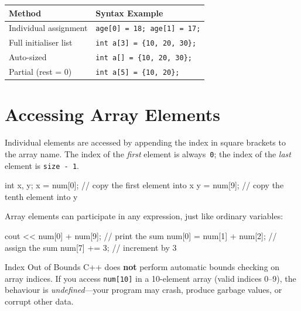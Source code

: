 \begin{center}
\renewcommand{\arraystretch}{1.4}
\begin{tabular}{@{} l l @{}}
\toprule
\textbf{Method} & \textbf{Syntax Example} \\
\midrule
Individual assignment & \texttt{age[0] = 18; age[1] = 17;} \\
Full initialiser list & \texttt{int a[3] = \{10, 20, 30\};} \\
Auto-sized            & \texttt{int a[] = \{10, 20, 30\};} \\
Partial (rest = 0)    & \texttt{int a[5] = \{10, 20\};} \\
\bottomrule
\end{tabular}
\end{center}

\section{Accessing Array Elements}
\label{sec:accessing-arrays}

Individual elements are accessed by appending the index in square brackets to
the array name. The index of the \emph{first} element is always~\texttt{0};
the index of the \emph{last} element is \texttt{size\,-\,1}.

\begin{cppcode}
int x, y;
x = num[0];   // copy the first element into x
y = num[9];   // copy the tenth element into y
\end{cppcode}

Array elements can participate in any expression, just like ordinary
variables:

\begin{cppcode}
cout << num[0] + num[9];     // print the sum
num[0] = num[1] + num[2];   // assign the sum
num[7] += 3;                 // increment by 3
\end{cppcode}

\begin{warningbox}{Index Out of Bounds}
C++ does \textbf{not} perform automatic bounds checking on array indices. If
you access \texttt{num[10]} in a 10-element array (valid indices 0--9), the
behaviour is \emph{undefined}---your program may crash, produce garbage
values, or corrupt other data.
\end{warningbox}

